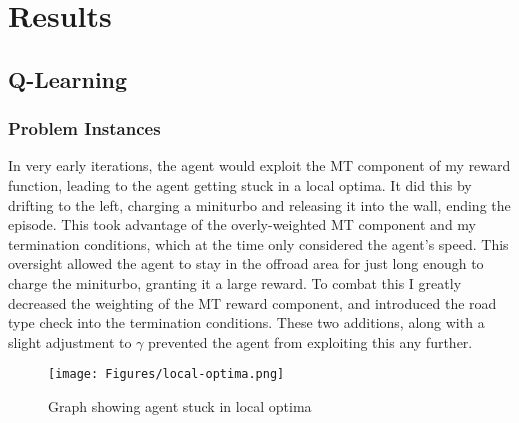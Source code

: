 \chapter{Results}
\section{Q-Learning}
\subsection{Problem Instances}
In very early iterations, the agent would exploit the MT component of my reward function, leading to the agent getting stuck in a local optima. It did this by drifting to the left, charging a miniturbo and releasing it into the wall, ending the episode. This took advantage of the overly-weighted MT component and my termination conditions, which at the time only considered the agent's speed. This oversight allowed the agent to stay in the offroad area for just long enough to charge the miniturbo, granting it a large reward. To combat this I greatly decreased the weighting of the MT reward component, and introduced the road type check into the termination conditions. These two additions, along with a slight adjustment to $\gamma$ prevented the agent from exploiting this any further.
\begin{figure}[hbt]
    \centering
    \texttt{[image: Figures/local-optima.png]}\label{fig:local-optima}
    \hfill
    \caption{Graph showing agent stuck in local optima}
\end{figure}
